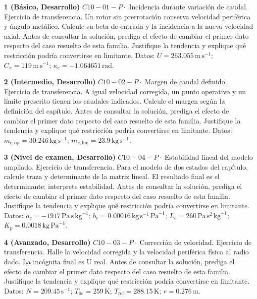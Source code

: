 \documentclass[10pt,openany]{book}
\begin{document}
\begin{tcolorbox}[title={Ejercicios propuestos}, studiumworked, breakable]

\noindent\textbf{1 (Básico, Desarrollo)}
\(C10-01-P \cdot\) Incidencia durante variación de caudal. Ejercicio de transferencia. Un rotor sin prerrotación conserva velocidad periférica y ángulo metálico. Calcule su beta de entrada y la incidencia a la nueva velocidad axial. Antes de consultar la solución, prediga el efecto de cambiar el primer dato respecto del caso resuelto de esta familia. Justifique la tendencia y explique qué restricción podría convertirse en limitante. Datos: \(U=263.055\, \mathrm{m}\,\mathrm{s}^{-1}\); \(C_x=119\, \mathrm{m}\,\mathrm{s}^{-1}\); \(\kappa_e=-1.064651\, \mathrm{rad}\).

\noindent\textbf{2 (Intermedio, Desarrollo)}
\(C10-02-P \cdot\) Margen de caudal definido. Ejercicio de transferencia. A igual velocidad corregida, un punto operativo y un límite prescrito tienen los caudales indicados. Calcule el margen según la definición del capítulo. Antes de consultar la solución, prediga el efecto de cambiar el primer dato respecto del caso resuelto de esta familia. Justifique la tendencia y explique qué restricción podría convertirse en limitante. Datos: \(\dot{m}_{c,\mathrm{op}}=30.246\, \mathrm{kg}\,\mathrm{s}^{-1}\); \(\dot{m}_{c,\mathrm{lim}}=23.9\, \mathrm{kg}\,\mathrm{s}^{-1}\).

\noindent\textbf{3 (Nivel de examen, Desarrollo)}
\(C10-04-P \cdot\) Estabilidad lineal del modelo ampliado. Ejercicio de transferencia. Para el modelo de dos estados del capítulo, calcule traza y determinante de la matriz lineal. El resultado final es el determinante; interprete estabilidad. Antes de consultar la solución, prediga el efecto de cambiar el primer dato respecto del caso resuelto de esta familia. Justifique la tendencia y explique qué restricción podría convertirse en limitante. Datos: \(a_c=-1917\, \mathrm{Pa}\,\mathrm{s}\,\mathrm{kg}^{-1}\); \(b_v=0.00016\, \mathrm{kg}\,\mathrm{s}^{-1}\,\mathrm{Pa}^{-1}\); \(L_c=260\, \mathrm{Pa}\,\mathrm{s}^{2}\,\mathrm{kg}^{-1}\); \(K_p=0.0018\, \mathrm{kg}\,\mathrm{Pa}^{-1}\).

\noindent\textbf{4 (Avanzado, Desarrollo)}
\(C10-03-P \cdot\) Corrección de velocidad. Ejercicio de transferencia. Halle la velocidad corregida y la velocidad periférica física al radio dado. La incógnita final es U real. Antes de consultar la solución, prediga el efecto de cambiar el primer dato respecto del caso resuelto de esta familia. Justifique la tendencia y explique qué restricción podría convertirse en limitante. Datos: \(N=209.45\, \mathrm{s}^{-1}\); \(T_{0e}=259\, \mathrm{K}\); \(T_{\mathrm{ref}}=288.15\, \mathrm{K}\); \(r=0.276\, \mathrm{m}\).
\end{tcolorbox}
\end{document}
